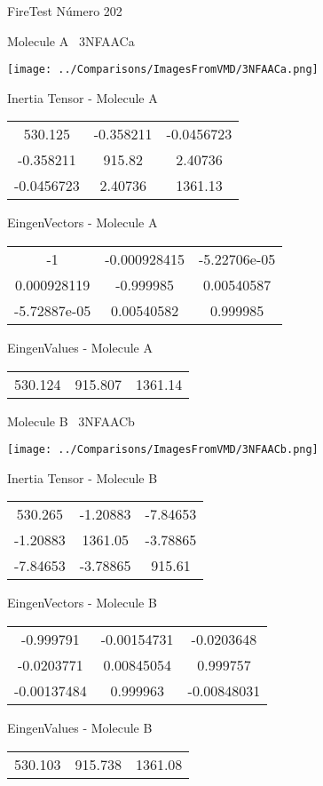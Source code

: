  \newpage

\vtab[-3cm]
\begin{center}
{\large FireTest \tab Número 202}
\end{center}
\begin{multicols}{2}
\begin{center}

Molecule A \
3NFAACa

\texttt{[image: ../Comparisons/ImagesFromVMD/3NFAACa.png]}

Inertia Tensor - Molecule A \\
\begin{tabular}{|c c c|}
530.125	 & 	-0.358211	 & 	-0.0456723	 \\
-0.358211	 & 	915.82	 & 	2.40736	 \\
-0.0456723	 & 	2.40736	 & 	1361.13
\end{tabular}

\vtab
 EingenVectors - Molecule A     \\
\begin{tabular}{|c c c|}
-1	 & 	-0.000928415	 & 	-5.22706e-05	 \\
0.000928119	 & 	-0.999985	 & 	0.00540587	 \\
-5.72887e-05	 & 	0.00540582	 & 	0.999985
\end{tabular}

\vtab
 EingenValues - Molecule A     \\
\begin{tabular}{|c c c|}
530.124	 & 	915.807	 & 	1361.14	 \\
\end{tabular}
\columnbreak

Molecule B \
3NFAACb

\texttt{[image: ../Comparisons/ImagesFromVMD/3NFAACb.png]}

Inertia Tensor - Molecule B \\
\begin{tabular}{|c c c|}
530.265	 & 	-1.20883	 & 	-7.84653	 \\
-1.20883	 & 	1361.05	 & 	-3.78865	 \\
-7.84653	 & 	-3.78865	 & 	915.61
\end{tabular}

\vtab
 EingenVectors - Molecule B     \\
\begin{tabular}{|c c c|}
-0.999791	 & 	-0.00154731	 & 	-0.0203648	 \\
-0.0203771	 & 	0.00845054	 & 	0.999757	 \\
-0.00137484	 & 	0.999963	 & 	-0.00848031
\end{tabular}

\vtab
 EingenValues - Molecule B     \\
\begin{tabular}{|c c c|}
530.103	 & 	915.738	 & 	1361.08	 \\
\end{tabular}

\end{center}
\end{multicols}

